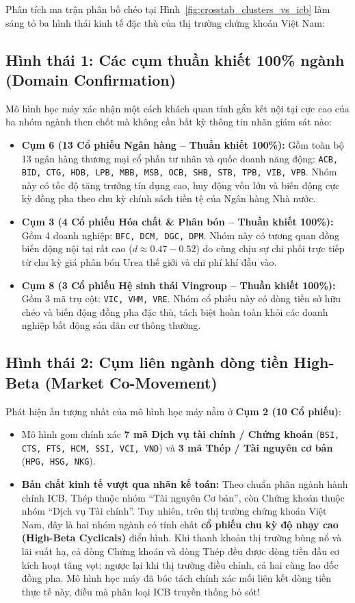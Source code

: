 \documentclass[12pt,a4paper,oneside,openany]{report}
\begin{document}
Phân tích ma trận phân bố chéo tại Hình~\ref{fig:crosstab_clusters_vs_icb} làm sáng tỏ ba hình thái kinh tế đặc thù của thị trường chứng khoán Việt Nam:

\subsection{Hình thái 1: Các cụm thuần khiết 100\% ngành (Domain Confirmation)}
Mô hình học máy xác nhận một cách khách quan tính gắn kết nội tại cực cao của ba nhóm ngành then chốt mà không cần bất kỳ thông tin nhãn giám sát nào:
\begin{itemize}
  \item \textbf{Cụm 6 (13 Cổ phiếu Ngân hàng -- Thuần khiết 100\%):}  
  Gồm toàn bộ 13 ngân hàng thương mại cổ phần tư nhân và quốc doanh năng động: \texttt{ACB, BID, CTG, HDB, LPB, MBB, MSB, OCB, SHB, STB, TPB, VIB, VPB}. Nhóm này có tốc độ tăng trưởng tín dụng cao, huy động vốn lớn và biến động cực kỳ đồng pha theo chu kỳ chính sách tiền tệ của Ngân hàng Nhà nước.
  \item \textbf{Cụm 3 (4 Cổ phiếu Hóa chất \& Phân bón -- Thuần khiết 100\%):}  
  Gồm 4 doanh nghiệp: \texttt{BFC, DCM, DGC, DPM}. Nhóm này có tương quan đồng biến động nội tại rất cao ($d \approx 0.47 - 0.52$) do cùng chịu sự chi phối trực tiếp từ chu kỳ giá phân bón Urea thế giới và chi phí khí đầu vào.
  \item \textbf{Cụm 8 (3 Cổ phiếu Hệ sinh thái Vingroup -- Thuần khiết 100\%):}  
  Gồm 3 mã trụ cột: \texttt{VIC, VHM, VRE}. Nhóm cổ phiếu này có dòng tiền sở hữu chéo và biến động đồng pha đặc thù, tách biệt hoàn toàn khỏi các doanh nghiệp bất động sản dân cư thông thường.
\end{itemize}

\subsection[Cụm liên ngành dòng tiền High-Beta]{Hình thái 2: Cụm liên ngành dòng tiền High-Beta (Market Co-Movement)}
Phát hiện ấn tượng nhất của mô hình học máy nằm ở \textbf{Cụm 2 (10 Cổ phiếu)}:
\begin{itemize}
  \item Mô hình gom chính xác \textbf{7 mã Dịch vụ tài chính / Chứng khoán} (\texttt{BSI, CTS, FTS, HCM, SSI, VCI, VND}) và \textbf{3 mã Thép / Tài nguyên cơ bản} (\texttt{HPG, HSG, NKG}).
  \item \textbf{Bản chất kinh tế vượt qua nhãn kế toán:} Theo chuẩn phân ngành hành chính ICB, Thép thuộc nhóm ``Tài nguyên Cơ bản'', còn Chứng khoán thuộc nhóm ``Dịch vụ Tài chính''. Tuy nhiên, trên thị trường chứng khoán Việt Nam, đây là hai nhóm ngành có tính chất \textbf{cổ phiếu chu kỳ độ nhạy cao (High-Beta Cyclicals)} điển hình. Khi thanh khoản thị trường bùng nổ và lãi suất hạ, cả dòng Chứng khoán và dòng Thép đều được dòng tiền đầu cơ kích hoạt tăng vọt; ngược lại khi thị trường điều chỉnh, cả hai cùng lao dốc đồng pha. Mô hình học máy đã bóc tách chính xác mối liên kết dòng tiền thực tế này, điều mà phân loại ICB truyền thống bỏ sót!
\end{itemize}
\end{document}
